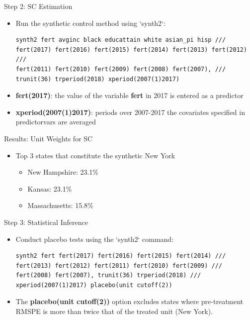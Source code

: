 \documentclass[dvipsnames,hyperref={pdfpagelabels=false}]{beamer}
\begin{document}
\begin{frame}[fragile]{Step 2: SC Estimation}
\begin{itemize}
	\item Run the synthetic control method using `synth2`:
\begin{lstlisting}
synth2 fert avginc black educattain white asian_pi hisp ///
fert(2017) fert(2016) fert(2015) fert(2014) fert(2013) fert(2012) ///
fert(2011) fert(2010) fert(2009) fert(2008) fert(2007), ///
trunit(36) trperiod(2018) xperiod(2007(1)2017)
\end{lstlisting}
\vspace{0.2cm}
\item \textbf{fert(2017)}: the value of the variable \textbf{fert} in 2017 is entered as a predictor
\vspace{0.2cm}
\item \textbf{xperiod(2007(1)2017)}: periods over 2007-2017 the covariates specified in predictorvars are averaged
\end{itemize}
\end{frame}


\begin{frame}{Results: Unit Weights for SC}
\begin{itemize}
	\item Top 3 states that constitute the synthetic New York
	\begin{itemize}
		\vspace{0.2cm}
		\item New Hampshire: 23.1\%
		\vspace{0.2cm}
		\item Kansas: 23.1\%
		\vspace{0.2cm}
		\item Massachusetts: 15.8\%		
	\end{itemize}
	
	
\end{itemize}
\end{frame}


\begin{frame}[fragile]{Step 3: Statistical Inference}
\begin{itemize}
\item Conduct placebo tests using the `synth2` command:
\begin{lstlisting}
synth2 fert fert(2017) fert(2016) fert(2015) fert(2014) ///
fert(2013) fert(2012) fert(2011) fert(2010) fert(2009) ///
fert(2008) fert(2007), trunit(36) trperiod(2018) ///
xperiod(2007(1)2017) placebo(unit cutoff(2))
\end{lstlisting}
	\item The \textbf{placebo(unit cutoff(2))} option excludes states where pre-treatment RMSPE is more than twice that of the treated unit (New York).
\end{itemize}
\end{frame}
\end{document}
